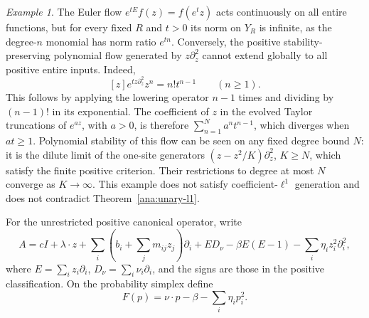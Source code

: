 \documentclass[reqno]{amsart}
\theoremstyle{definition}
\theoremstyle{remark}
\newtheorem{example}[theorem]{Example}
\begin{document}
\begin{example}\label{ana:topology-warning}
The Euler flow \(e^{tE}f(z)=f(e^tz)\) acts continuously on all entire
functions, but for every fixed \(R\) and \(t>0\) its norm on \(Y_R\)
is infinite, as the degree-\(n\) monomial has norm ratio \(e^{tn}\).
Conversely, the positive stability-preserving polynomial flow
generated by \(z\partial_z^2\) cannot extend globally to all positive
entire inputs.  Indeed,
\[
 [z]e^{tz\partial_z^2}z^n=n!t^{n-1}\qquad(n\ge1).
\]
This follows by applying the lowering operator \(n-1\) times and dividing
by \((n-1)!\) in its exponential.  The coefficient of \(z\) in the evolved
Taylor truncations of \(e^{az}\), with \(a>0\), is therefore
\(\sum_{n=1}^N a^nt^{n-1}\), which diverges when \(at\ge1\).
Polynomial stability of this flow can be seen on any fixed degree bound
\(N\): it is the dilute limit of the one-site generators
\((z-z^2/K)\partial_z^2\), \(K\ge N\), which satisfy the finite positive
criterion.  Their restrictions to degree at most \(N\) converge as
\(K\to\infty\).  This example does not satisfy coefficient-\(\ell^1\)
generation and does not contradict Theorem~\ref{ana:unary-l1}.
\end{example}

For the unrestricted positive canonical operator, write
\[
 A=cI+\lambda\cdot z+
 \sum_i\left(b_i+\sum_jm_{ij}z_j\right)\partial_i
 +E D_\nu-\beta E(E-1)-\sum_i\eta_i z_i^2\partial_i^2,
\]
where \(E=\sum_i z_i\partial_i\), \(D_\nu=\sum_i\nu_i\partial_i\),
and the signs are those in the positive classification.  On the probability
simplex define
\[
 F(p)=\nu\cdot p-\beta-\sum_i\eta_i p_i^2.
\]
\end{document}
